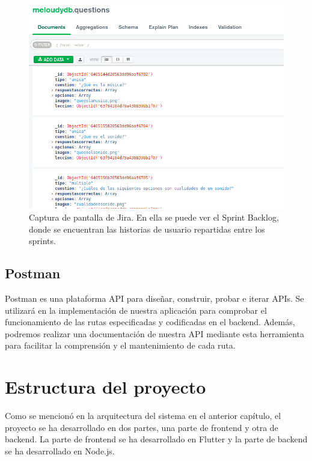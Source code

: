 \begin{figure}[H]
  \centering
  \includegraphics[width=\textwidth]{imagenes/c7/compass.png}
  \caption{Captura de pantalla de Jira. En ella se puede ver el Sprint Backlog, donde se encuentran las historias de usuario repartidas entre los sprints.}
  \label{fig:login}
\end{figure}

\subsection{Postman}
Postman es una plataforma API para diseñar, construir, probar e iterar APIs. Se utilizará en la implementación de nuestra aplicación para comprobar el funcionamiento de las rutas especificadas y codificadas en el backend. Además, podremos realizar una documentación de nuestra API mediante
esta herramienta para facilitar la comprensión y el mantenimiento de cada ruta.



\section{Estructura del proyecto}
\label{sec:estructura}
Como se mencionó en la arquitectura del sistema en el anterior capítulo, el proyecto se ha desarrollado en dos partes, una parte de frontend y otra de backend. La parte de frontend se ha desarrollado en Flutter y la parte de backend se ha desarrollado en Node.js. 

